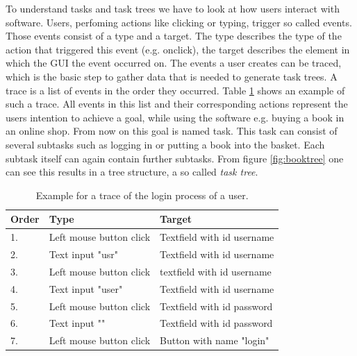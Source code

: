 To understand tasks and task trees we have to look at how users interact with software.
Users, perfoming actions like clicking or typing, trigger so called events.
Those events consist of a type and a target.
The type describes the type of the action that triggered this event (e.g. onclick), the target describes the element in which the GUI the event occurred on.
The events a user creates can be traced, which is the basic step to gather data that is needed to generate task trees.
A trace is a list of events in the order they occurred. Table \ref{tab:trace} shows an example of such a trace.
All events in this list and their corresponding actions represent the users intention to achieve a goal, while using the software e.g. buying a book
in an online shop. From now on this goal is named task. This task can consist of several subtasks such as logging in or putting a book into the basket.
Each subtask itself can again contain further subtasks. From figure \ref{fig:booktree} one can see this results in a tree structure, a so called \textit{task tree}.

\begin{table}
\begin{center}
 \begin{tabular}{l|l|l}
	   Order & Type & Target \\
	 \hline
	 \hline
	   1. & Left mouse button click &  Textfield with id username \\
	   2. & Text input "usr" &  Textfield with id username \\
	   3. & Left mouse button click &  textfield with id username \\
	   4. & Text input "user" &  Textfield with id username \\
	   5. &Left mouse button click &  Textfield with id password \\
	   6. & Text input "" &  Textfield with id password \\
	   7. &Left mouse button click &  Button with name "login" \\
	  \end{tabular}
  \end{center}
  \caption{Example for a trace of the login process of a user.\cite{harms2013}}
  \label{tab:trace}
  \end{table}

